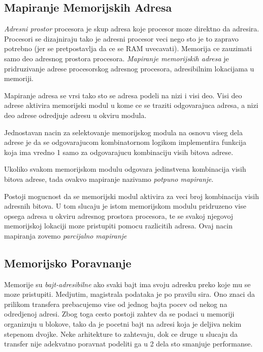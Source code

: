 \documentclass[12p,a4paper]{article}
\begin{document}
\begin{multicols}{2}
    \subsection{Mapiranje Memorijskih Adresa}

    \emph{Adresni prostor} procesora je skup adresa koje procesor moze 
    direktno da adresira. Procesori se dizajniraju tako je adresni procesor
    veci nego sto je to zapravo potrebno (jer se pretpostavlja da ce se
    RAM uvecavati). Memorija ce zauzimati samo deo adresnog prostora procesora.
    \emph{Mapiranje memorijskih adresa} je pridruzivanje adrese procesorskog 
    adresnog procesora, adresibilnim lokacijama u memoriji.

    Mapiranje adresa se vrsi tako sto se adresa podeli na nizi i visi deo.
    Visi deo adrese aktivira memorijski modul u kome ce se traziti 
    odgovarajuca adresa, a nizi deo adrese odredjuje adresu u 
    okviru modula. 

    Jednostavan nacin za selektovanje memorijskog modula na osnovu viseg dela 
    adrese je da se odgovarajucom kombinatornom logikom implementira funkcija 
    koja ima vredno 1 samo za odgovarajucu kombinaciju visih bitova adrese.
    
    Ukoliko svakom memorijskom modulu odgovara jedinstvena kombinacija visih
    bitova adrese, tada ovakvo mapiranje nazivamo \emph{potpuno mapiranje}.

    Postoji mogucnost da se memorijski modul aktivira za veci broj kombinacija
    visih adresnih bitova. U tom slucaju je istom memorijskom modulu pridruzeno
    vise opsega adresa u okviru adresnog prostora procesora, te se svakoj 
    njegovoj memorijskoj lokaciji moze pristupiti pomocu razlicitih adresa.
    Ovaj nacin mapiranja zovemo \emph{parcijalno mapiranje} 

    \subsection{Memorijsko Poravnanje}
    
    Memorije su \emph{bajt-adresibilne} ako svaki bajt ima svoju adresku preko 
    koje mu se moze pristupiti. Medjutim, magistrala podataka je po pravilu 
    sira. Ono znaci da prilikom transfera prebacujemo vise od jednog bajta
    pocev od nekog na odredjenoj adresi. Zbog toga cesto postoji zahtev da se
    podaci u memoriji organizuju u blokove, tako da je pocetni bajt
    na adresi koja je deljiva nekim stepenom dvojke. Neke arhitekture to 
    zahtevaju, dok ce druge u slucaju da transfer nije adekvatno poravnat
    podeliti ga u 2 dela sto smanjuje performanse.


\end{multicols}
\end{document}
